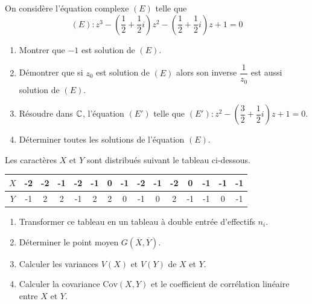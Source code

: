 \documentclass[11pt]{article}
\begin{document}


On considère l'équation complexe $(E)$ telle que
\[ (E) : z^3 - \left(\frac{1}{2} + \frac{1}{2}i\right)z^2 - \left(\frac{1}{2} + \frac{1}{2}i\right)z + 1 = 0 \]

\begin{enumerate}
  \item Montrer que $-1$ est solution de $(E)$.
  \item Démontrer que si $z_0$ est solution de $(E)$ alors son inverse $\dfrac{1}{z_0}$ est aussi solution de $(E)$.
  \item Résoudre dans $\mathbb{C}$, l'équation $(E')$ telle que $(E') : z^2 - \left(\dfrac{3}{2} + \dfrac{1}{2}i\right)z + 1 = 0$.
  \item Déterminer toutes les solutions de l'équation $(E)$.
\end{enumerate}


Les caractères $X$ et $Y$ sont distribués suivant le tableau ci-dessous.

\begin{center}
\setlength{\tabcolsep}{4pt}\renewcommand{\arraystretch}{1.3}
\begin{tabular}{|c|*{14}{c|}}
\hline
$X$ & -2 & -2 & -1 & -2 & -1 & 0 & -1 & -2 & -1 & -2 & 0 & -1 & -1 & -1 \\
\hline
$Y$ & -1 & 2 & 2 & -1 & 2 & 2 & 0 & -1 & 0 & 2 & -1 & -1 & 0 & -1 \\
\hline
\end{tabular}
\end{center}

\begin{enumerate}
  \item Transformer ce tableau en un tableau à double entrée d'effectifs $n_i$.
  \item Déterminer le point moyen $G(\overline{X},\overline{Y})$.
  \item Calculer les variances $V(X)$ et $V(Y)$ de $X$ et $Y$.
  \item Calculer la covariance $\mathrm{Cov}(X,Y)$ et le coefficient de corrélation linéaire entre $X$ et $Y$.
\end{enumerate}

\end{document}

